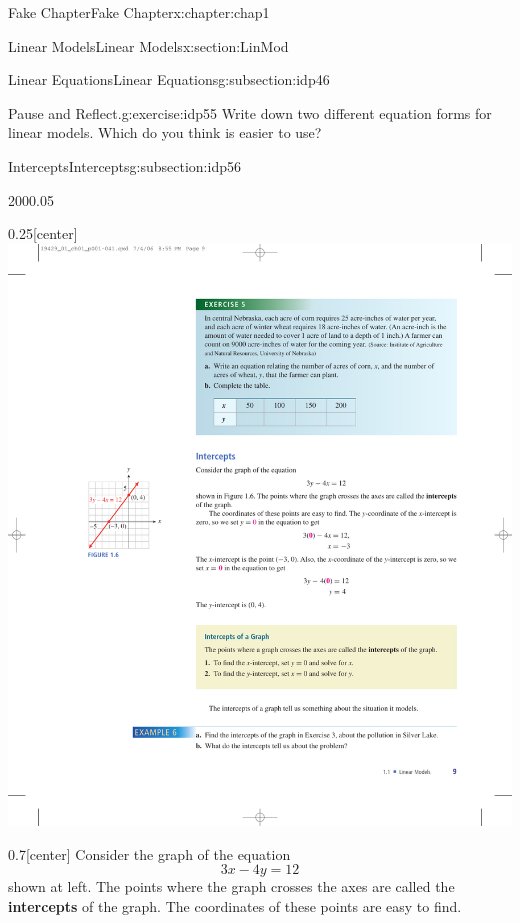 \documentclass[oneside,10pt,]{book}
\newcommand{\terminology}[1]{\textbf{#1}}
\numberwithin{equation}{section}
\begin{document}
\begin{chapterptx}{Fake Chapter}{}{Fake Chapter}{}{}{x:chapter:chap1}
\begin{sectionptx}{Linear Models}{}{Linear Models}{}{}{x:section:LinMod}
\begin{subsectionptx}{Linear Equations}{}{Linear Equations}{}{}{g:subsection:idp46}
\begin{inlineexercise}{Pause and Reflect.}{g:exercise:idp55}
Write down two different equation forms for linear models.  Which do you think is easier to use?%
\end{inlineexercise}%
\end{subsectionptx}
%
%
\typeout{************************************************}
\typeout{************************************************}
%
\begin{subsectionptx}{Intercepts}{}{Intercepts}{}{}{g:subsection:idp56}
\begin{sidebyside}{2}{0}{0}{0.05}%
\begin{sbspanel}{0.25}[center]%
\includegraphics[width=\linewidth]{external/photos/fig-intercepts.pdf}
\end{sbspanel}%
\begin{sbspanel}{0.7}[center]%
Consider the graph of the equation%
\begin{equation*}
3x-4y=12
\end{equation*}
shown at left. The points where the graph crosses the axes are called the \terminology{intercepts} of the graph. The coordinates of these points are easy to find.%
\end{sbspanel}%

\end{sidebyside}
\end{subsectionptx}
\end{sectionptx}
\end{chapterptx}
\end{document}
